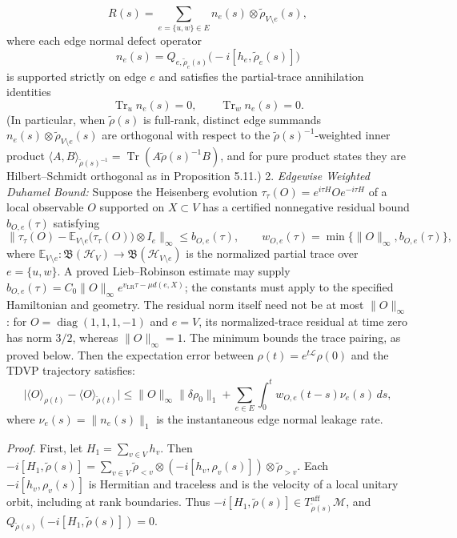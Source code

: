\documentclass[
  11pt,
]{article}
\begin{document}
\[
R(s) = \sum_{e=\{u,w\}\in E} n_e(s) \otimes \widetilde{\rho}_{V\setminus e}(s),
\]
where each edge normal defect operator
\[
n_e(s) = Q_{e, \widetilde{\rho}_e(s)}\bigl(-i[h_e, \widetilde{\rho}_e(s)]\bigr)
\]
is supported strictly on edge \(e\) and satisfies the partial-trace annihilation identities
\[
\operatorname{Tr}_u n_e(s) = 0, \qquad \operatorname{Tr}_w n_e(s) = 0.
\]
(In particular, when \(\widetilde{\rho}(s)\) is full-rank, distinct edge summands \(n_e(s)\otimes\widetilde{\rho}_{V\setminus e}(s)\) are orthogonal with respect to the \(\widetilde{\rho}(s)^{-1}\)-weighted inner product \(\langle A,B\rangle_{\widetilde{\rho}(s)^{-1}}=\operatorname{Tr}(A\widetilde{\rho}(s)^{-1}B)\), and for pure product states they are Hilbert--Schmidt orthogonal as in Proposition 5.11.)
2. \emph{Edgewise Weighted Duhamel Bound:} Suppose the Heisenberg evolution \(\tau_\tau(O) = e^{i\tau H}Oe^{-i\tau H}\) of a local observable \(O\) supported on \(X \subset V\) has a certified nonnegative residual bound \(b_{O,e}(\tau)\) satisfying
\[
\bigl\lVert \tau_\tau(O) - \mathbb{E}_{V\setminus e}\bigl(\tau_\tau(O)\bigr)\otimes I_e\bigr\rVert_\infty \le b_{O,e}(\tau),
\qquad w_{O,e}(\tau)=\min\{\lVert O\rVert_\infty,b_{O,e}(\tau)\},
\]
where \(\mathbb{E}_{V\setminus e}: \mathfrak{B}(\mathcal{H}_V) \to \mathfrak{B}(\mathcal{H}_{V\setminus e})\) is the normalized partial trace over \(e=\{u,w\}\).
A proved Lieb--Robinson estimate may supply
\(b_{O,e}(\tau)=C_0\lVert O\rVert_\infty e^{v_{\mathrm{LR}}\tau-\mu d(e,X)}\);
the constants must apply to the specified Hamiltonian and geometry.
The residual norm itself need not be at most \(\lVert O\rVert_\infty\):
for \(O=\operatorname{diag}(1,1,1,-1)\) and \(e=V\), its normalized-trace
residual at time zero has norm \(3/2\), whereas \(\lVert O\rVert_\infty=1\).
The minimum bounds the trace pairing, as proved below. Then the expectation
error between \(\rho(t)=e^{t\mathcal L}\rho(0)\) and the TDVP trajectory satisfies:
\[
\bigl|\langle O\rangle_{\rho(t)} - \langle O\rangle_{\widetilde{\rho}(t)}\bigr| \le \lVert O\rVert_\infty \lVert \delta\rho_0\rVert_1 + \sum_{e\in E} \int_0^t w_{O,e}(t-s) \nu_e(s)\,ds,
\]
where \(\nu_e(s) = \lVert n_e(s)\rVert_1\) is the instantaneous edge normal leakage rate.

\emph{Proof.} First, let \(H_1 = \sum_{v\in V} h_v\). Then \(-i[H_1, \widetilde{\rho}(s)] = \sum_{v\in V} \widetilde{\rho}_{<v} \otimes (-i[h_v, \rho_v(s)]) \otimes \widetilde{\rho}_{>v}\).
Each \(-i[h_v,\rho_v(s)]\) is Hermitian and traceless and is the velocity of a local unitary orbit, including at rank boundaries. Thus \(-i[H_1,\widetilde\rho(s)]\in T^{\mathrm{aff}}_{\widetilde\rho(s)}\mathcal M\), and \(Q_{\widetilde\rho(s)}(-i[H_1,\widetilde\rho(s)])=0\).
\end{document}
